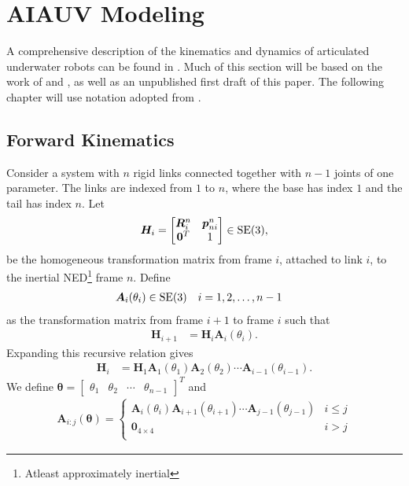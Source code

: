 \newpage
\section{AIAUV Modeling}

A comprehensive description of the kinematics and dynamics of articulated
underwater robots can be found in \cite{schmidt2018}. Much of this section
will be based on the work of \cite{from2014} and \cite{schmidt2018}, as well as an unpublished
first draft of this paper. The following chapter will use notation adopted from
\cite{from2014}.

\subsection{Forward Kinematics}
\label{sec:forward_kinematics}
Consider a system with $n$ rigid links connected together with $n-1$ joints
of one parameter. The links are indexed from $1$ to $n$, where the base
has index $1$ and the tail has index $n$. Let
\begin{align}
    \bm{H}_i = \begin{bmatrix}
        \bm{R}_i^n & \bm{p}_{ni}^n \\
        \bm{0}^T & 1
    \end{bmatrix} \in \operatorname{SE}(3),
\end{align}
be the homogeneous transformation matrix from frame $i$, attached to link $i$,
to the inertial NED\footnote{Atleast approximately inertial} frame $n$. Define
\begin{align}
    \bm{A}_i(\theta_i) &\in \operatorname{SE}(3) & i &= 1, 2, \ldots, n-1
\end{align}
as the transformation matrix from frame $i+1$ to frame $i$ such that
\begin{align}
    \bm{H}_{i+1} &= \bm{H}_i \bm{A}_i(\theta_i).
\end{align}
Expanding this recursive relation gives
\begin{align}
    \bm{H}_i &= \bm{H}_1 \bm{A}_1(\theta_1) \bm{A}_2(\theta_2) \cdots \bm{A}_{i-1}(\theta_{i-1}).
\end{align}
We define $\bm{\theta} = \begin{bmatrix}\theta_1 & \theta_2 & \cdots & \theta_{n-1}\end{bmatrix}^T$
and
\begin{align}
    \bm{A}_{i:j}(\bm{\theta}) =
    \begin{cases}
        \bm{A}_i(\theta_i) \bm{A}_{i+1}(\theta_{i+1}) \cdots \bm{A}_{j-1}(\theta_{j-1}) & i \leq j \\
        \bm{0}_{4 \times 4} & i > j \\
    \end{cases}
\end{align}
